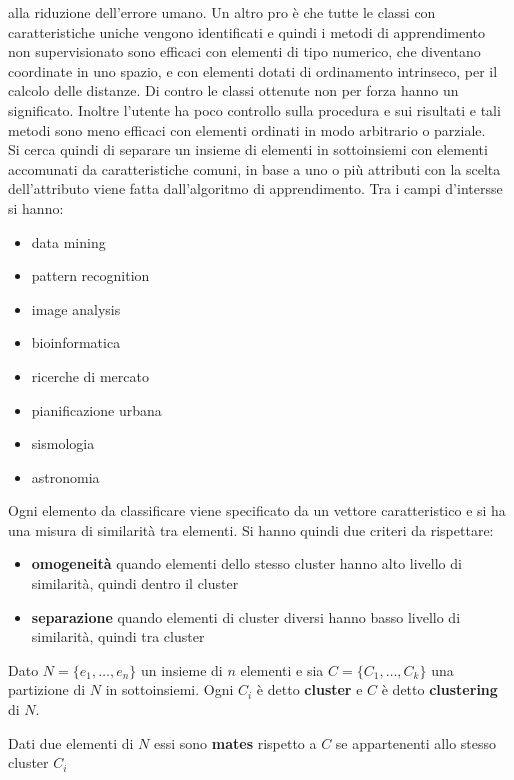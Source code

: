 alla riduzione dell'errore umano. Un altro pro è che tutte le classi con
caratteristiche uniche vengono identificati e quindi i metodi di apprendimento
non supervisionato sono efficaci con elementi di tipo numerico, che diventano
coordinate in uno spazio, e con elementi dotati di ordinamento intrinseco, per
il calcolo delle distanze. Di contro le classi ottenute non per forza hanno un
significato. Inoltre l'utente ha poco controllo sulla procedura e sui risultati
e tali metodi sono meno efficaci con elementi ordinati in modo arbitrario o
parziale. \\
Si cerca quindi di separare un insieme di elementi in sottoinsiemi con elementi
accomunati da caratteristiche comuni, in base a uno o più attributi con la
scelta dell'attributo viene fatta dall'algoritmo di apprendimento. Tra i campi
d'intersse si hanno:
\begin{itemize}
  \item data mining
  \item pattern recognition
  \item image analysis 
  \item bioinformatica 
  \item ricerche di mercato
  \item pianificazione urbana 
  \item sismologia 
  \item astronomia
\end{itemize}
Ogni elemento da classificare viene specificato da un vettore caratteristico e
si ha una misura di similarità tra elementi. Si hanno quindi due criteri da 
rispettare:
\begin{itemize}
  \item \textbf{omogeneità} quando elementi dello stesso cluster hanno alto
  livello di similarità, quindi dentro il cluster
  \item \textbf{separazione} quando elementi di cluster diversi hanno basso
  livello di similarità, quindi tra cluster
\end{itemize}
\begin{definizione}
  Dato $N=\{e_1,\ldots, e_n\}$ un insieme di $n$ elementi e sia
  $C=\{C_1,\ldots, C_k\}$ una partizione di $N$ in sottoinsiemi. Ogni $C_i$ è
  detto \textbf{cluster} e $C$ è detto \textbf{clustering} di $N$.
\end{definizione}
\begin{definizione}
  Dati due elementi di $N$ essi sono \textbf{mates} rispetto a $C$ se
  appartenenti allo stesso cluster $C_i$
\end{definizione}
